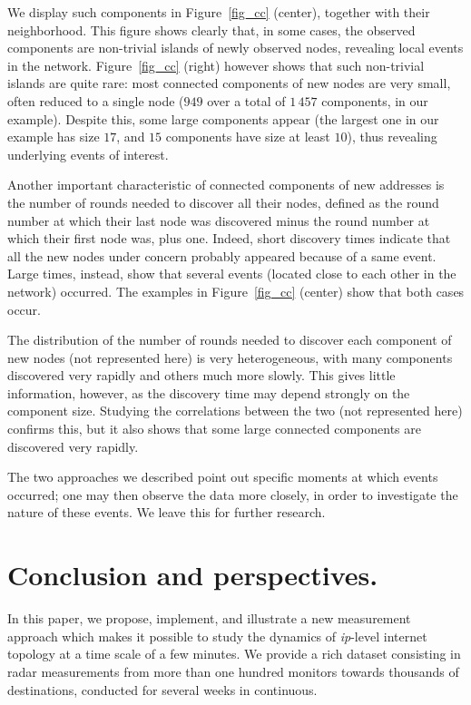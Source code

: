 \documentclass[times, 10pt,twocolumn]{article}
\newcommand{\ip}{\mbox{\em \sc ip}}
\begin{document}
We display such components in Figure~\ref{fig_cc} (center), together
with their neighborhood. This figure shows clearly that, in some
cases, the observed components are non-trivial islands of newly
observed nodes, revealing local events in the network. 
Figure~\ref{fig_cc} (right) however shows that such non-trivial islands are quite rare: most connected components of new nodes are very small, often reduced to a single node ($949$ over a total of $1\,457$ components, in our example). Despite this, some large components appear (the largest one in our example has size $17$, and $15$ components have size at least $10$), thus revealing underlying events of interest.

Another important characteristic of connected components of new addresses is the number of rounds needed to discover all their nodes, defined as the round number at which their last node was discovered minus the round number at which their first node was, plus one. Indeed, short discovery times indicate that all the new nodes under concern probably appeared because of a same event. Large times, instead, show that several events (located close to each other in the network) occurred. The examples in Figure~\ref{fig_cc} (center) show that both cases occur.

The distribution of the number of rounds needed to discover each component of new nodes (not represented here) is very heterogeneous, with many components discovered very rapidly and others much more slowly. This gives little information, however, as the discovery time may depend strongly on the component size. Studying the correlations between the two (not represented here) confirms this, but it also shows that some large connected components are discovered very rapidly.

\medskip

The two approaches we described point out specific moments at which events occurred;
one may then observe the data more
closely, in order to investigate the nature of these events. We leave
this for further research.


\section{Conclusion and perspectives.}
\label{sec_conclusion}

In this paper, we propose, implement, and illustrate a new measurement
approach which makes it possible to study the dynamics of \ip -level
internet topology at a time scale of a few minutes. We provide a rich
dataset consisting in radar measurements from more than one
hundred monitors towards thousands of destinations, conducted for
several weeks in continuous.
\end{document}
